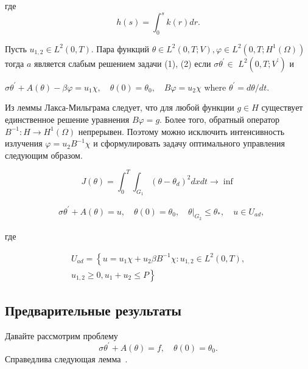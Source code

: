 где
\[
    h(s)=\int_{0}^{s} k(r) d r.
\]

\begin{definition}
    Пусть $u_{1,2} \in L^{2}(0, T)$.
    Пара функций $\theta \in L^{2}(0, T ; V), \varphi \in L^{2}\left(0, T ; H^{1}(\Omega)\right)$
    тогда $a$ является слабым решением задачи (1), (2)
    если $\sigma \theta^{\prime} \in$ $L^{2}\left(0, T ; V^{\prime}\right)$ и

    $\sigma \theta^{\prime}+A(\theta)-\beta \varphi=u_{1} \chi, \quad \theta(0)=\theta_{0},
    \quad B \varphi=u_{2} \chi$ where $\theta^{\prime}=d \theta / d t$.
\end{definition}

Из леммы Лакса-Мильграма следует, что для любой функции $g \in H$
существует единственное решение уравнения $B \varphi=g$.
Более того, обратный оператор $B^{-1}: H \rightarrow H^{1}(\Omega)$ непрерывен.
Поэтому можно исключить интенсивность излучения $\varphi=u_{2} B^{-1} \chi$ и
сформулировать задачу оптимального управления следующим образом.

\begin{definition}
    [Problem (P)]
    \label{subsec:ch3:sec2:subsec3}
    \[
        J(\theta)=\int_{0}^{T}
        \int_{G_{1}}\left(\theta-\theta_{d}\right)^{2} d x d t \rightarrow \inf
    \]

    \[
        \begin{aligned}
            & \sigma \theta^{\prime}+A(\theta)=u,
            \quad \theta(0)=\theta_{0},\left.\quad
            \theta\right|_{G_{2}} \leq \theta_{*},
            \quad u \in U_{a d},
        \end{aligned}
    \]

    где

    \[
        \begin{array}{r}
            U_{a d}=\left\{u=u_{1} \chi+u_{2} \beta B^{-1}
            \chi: u_{1,2} \in L^{2}(0, T),\right. \\
            \left.u_{1,2} \geq 0, u_{1}+u_{2} \leq P\right\}
        \end{array}
    \]
\end{definition}

\subsection{Предварительные результаты}
\label{subsec:ch3:sec2:subsec4}
Давайте рассмотрим проблему
\begin{equation}
    \label{eq:3_2:3}
    \sigma \theta^{\prime}+A(\theta)=f, \quad \theta(0)=\theta_{0}.
\end{equation}
Справедлива следующая лемма~\cite{Inverse_Kovtanyuk2021}.

